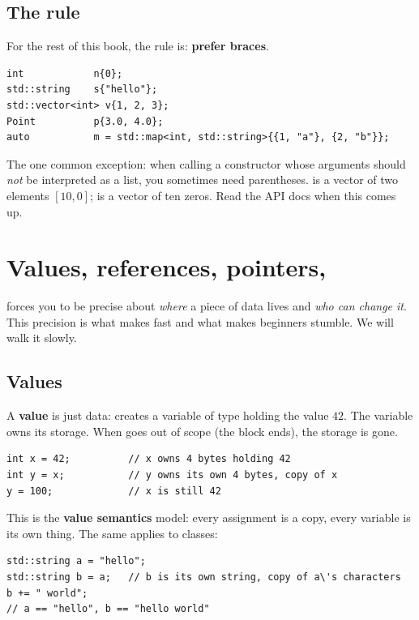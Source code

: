 \subsection{The rule}

For the rest of this book, the rule is: \textbf{prefer braces}.

\begin{lstlisting}
int            n{0};
std::string    s{"hello"};
std::vector<int> v{1, 2, 3};
Point          p{3.0, 4.0};
auto           m = std::map<int, std::string>{{1, "a"}, {2, "b"}};
\end{lstlisting}

The one common exception: when calling a constructor whose arguments
should \emph{not} be interpreted as a list, you sometimes need
parentheses.  is a vector of two
elements $[10, 0]$;  is a vector of
ten zeros. Read the API docs when this comes up.

\section{Values, references, pointers, }
\label{sec:cpp:memory}

\cpp{} forces you to be precise about \emph{where} a piece of data
lives and \emph{who can change it}. This precision is what makes
\cpp{} fast and what makes beginners stumble. We will walk it slowly.

\subsection{Values}

A \textbf{value} is just data:  creates a variable
 of type  holding the value $42$. The variable
owns its storage. When  goes out of scope (the block ends),
the storage is gone.

\begin{lstlisting}
int x = 42;          // x owns 4 bytes holding 42
int y = x;           // y owns its own 4 bytes, copy of x
y = 100;             // x is still 42
\end{lstlisting}

This is the \textbf{value semantics} model: every assignment is a
copy, every variable is its own thing. The same applies to classes:

\begin{lstlisting}
std::string a = "hello";
std::string b = a;   // b is its own string, copy of a\'s characters
b += " world";
// a == "hello", b == "hello world"
\end{lstlisting}

